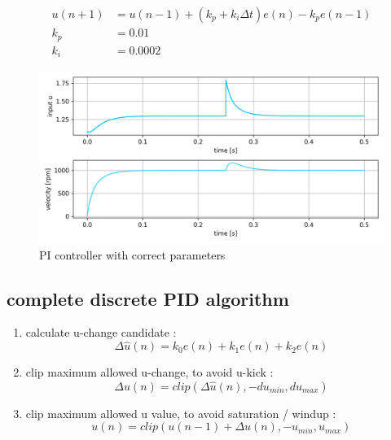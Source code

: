 \documentclass[12pt,twoside,onecolumn,openany,extrafontsizes,dvipsnames]{memoir}
\begin{document}
                \begin{align*}
                u(n+1) &= u(n-1) + (k_p + k_i\Delta t) e(n) - k_pe(n-1) \\
                k_p    &= 0.01 \\
                k_i    &= 0.0002
                \end{align*}

                \begin{figure}[!htb]
                    \centering
                    \includegraphics[scale=0.8]{../images/motor_control/pid_pi_control_1.png}
                    \caption{PI controller with correct parameters}
                    \label{fig:pi_controller_correct}
                \end{figure}
                
            \newpage
            \subsection{complete discrete PID algorithm}  
    
                \begin{enumerate}
                  \item  calculate u-change candidate :
                    $$\Delta \hat{u}(n) = k_0e(n) + k_1e(n) + k_2e(n)$$
                  
                  \item clip maximum allowed u-change, to avoid u-kick :
                    $$\Delta u(n) = clip(\Delta \hat{u}(n), -du_{min}, du_{max})$$
              
                  \item clip maximum allowed u value, to avoid saturation / windup :
                    $$u(n) = clip(u(n-1) + \Delta u(n), -u_{min}, u_{max})$$
                \end{enumerate}
\end{document}
